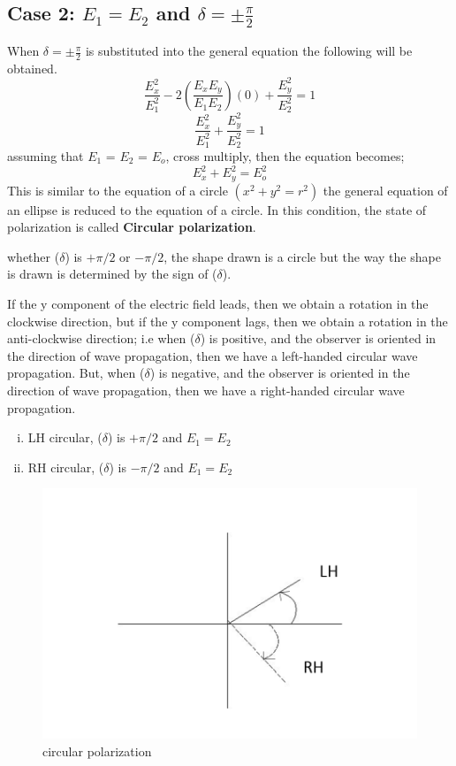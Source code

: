 \subsection{Case 2: $ E_1 = E_2 $ and $\delta = \pm \frac{\pi}{2}$}
When $\delta = \pm \frac{\pi}{2}$ is substituted into the general equation the following will be obtained.
\begin{equation}
\frac{E_{x}^2}{E_{1}^2} -2(\frac{E_{x}E_{y}}{E_{1}E_{2}})(0) + \frac{E_{y}^2}{E_{2}^2} = 1
\end{equation}
\begin{equation}
\frac{E_{x}^2}{E_{1}^2} + \frac{E_{y}^2}{E_{2}^2} = 1
\end{equation}
assuming that $ E_1 $ = $ E_2 $ = $ E_{o} $, cross multiply, then the equation becomes;
\begin{equation}
{E_{x}^2} + {E_{y}^2} = {E_{o}^2}
\end{equation}
This is similar to the equation of a circle $(x^2 + y^2 = r^2)$ the general equation of an ellipse is reduced to the equation of a circle. In this condition, the state of polarization is called \textbf{Circular polarization}.

whether  ($\delta$) is $+\pi/2$  or  $-\pi/2 $, the shape drawn is a circle but the way the shape is drawn is determined by the sign of ($\delta$).

If the y component of the electric field leads, then we obtain a rotation in the clockwise direction, but if the y component lags, then we obtain a rotation in the anti-clockwise direction; i.e when ($\delta$) is positive, and the observer is oriented in the direction of wave propagation, then we have a left-handed circular wave propagation. But, when ($\delta$) is negative, and the observer is oriented in the direction of wave propagation, then we have a right-handed circular wave propagation.
\begin{enumerate}[(i)]
\item LH circular, ($\delta$) is $ +\pi/2$ and $ E_1 = E_2$
\item RH circular, ($\delta$) is $-\pi/2$ and $ E_1 = E_2$ 
\end{enumerate}
\begin{figure}[h]
\centering
\includegraphics[width=.8\linewidth]{./graphics/fielddirect}
\caption{circular polarization}
\end{figure} 

